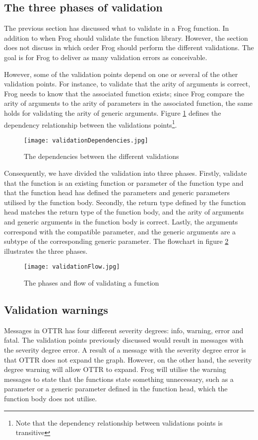 \subsection{The three phases of validation}
The previous section has discussed what to validate in a Frog function. In addition to when Frog should validate the function library. However, the section does not discuss in which order Frog should perform the different validations. The goal is for Frog to deliver as many validation errors as conceivable. 

\para
However, some of the validation points depend on one or several of the other validation points. For instance, to validate that the arity of arguments is correct, Frog needs to know that the associated function exists; since Frog compare the arity of arguments to the arity of parameters in the associated function, the same holds for validating the arity of generic arguments. Figure \ref{fig:validationDependencies} defines the dependency relationship between the validations points\footnote{Note that the dependency relationship between validations points is transitive}. 

\begin{figure}
    \centering
    \texttt{[image: validationDependencies.jpg]}
    \caption{The dependencies between the different validations}
    \label{fig:validationDependencies}
\end{figure}

\para
Consequently, we have divided the validation into three phases. Firstly, validate that the function is an existing function or parameter of the function type and that the function head has defined the parameters and generic parameters utilised by the function body. Secondly, the return type defined by the function head matches the return type of the function body, and the arity of arguments and generic arguments in the function body is correct. Lastly, the arguments correspond with the compatible parameter, and the generic arguments are a subtype of the corresponding generic parameter. The flowchart in figure \ref{fig:LC-explenations} illustrates the three phases. 

\begin{figure}
    \centering
    \texttt{[image: validationFlow.jpg]}
    \caption{The phases and flow of validating a function}
    \label{fig:LC-explenations}
\end{figure}

\subsection{Validation warnings}
Messages in OTTR has four different severity degrees: info, warning, error and fatal. The validation points previously discussed would result in messages with the severity degree error. A result of a message with the severity degree error is that OTTR does not expand the graph. However, on the other hand, the severity degree warning will allow OTTR to expand. Frog will utilise the warning messages to state that the functions state something unnecessary, such as a parameter or a generic parameter defined in the function head, which the function body does not utilise.  


